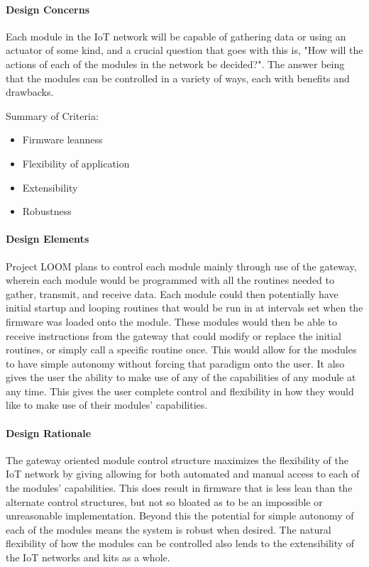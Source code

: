 \documentclass[onecolumn, draftclsnofoot,10pt, compsoc]{IEEEtran}
\begin{document}
\paragraph{Design Concerns}
Each module in the IoT network will be capable of gathering data or using an actuator of some kind, and a crucial question that goes with this is, "How will the actions of each of the modules in the network be decided?". The answer being that the modules can be controlled in a variety of ways, each with benefits and drawbacks.

Summary of Criteria: 
\begin{itemize}[noitemsep,topsep=-10pt]
\item Firmware leanness
\item Flexibility of application
\item Extensibility
\item Robustness
\end{itemize}

\paragraph{Design Elements}
Project LOOM plans to control each module mainly through use of the gateway, wherein each module would be programmed with all the routines needed to gather, transmit, and receive data. Each module could then potentially have initial startup and looping routines that would be run in at intervals set when the firmware was loaded onto the module. These modules would then be able to receive instructions from the gateway that could modify or replace the initial routines, or simply call a specific routine once. This would allow for the modules to have simple autonomy without forcing that paradigm onto the user. It also gives the user the ability to make use of any of the capabilities of any module at any time. This gives the user complete control and flexibility in how they would like to make use of their modules' capabilities.

\paragraph{Design Rationale}
The gateway oriented module control structure maximizes the flexibility of the IoT network by giving allowing for both automated and manual access to each of the modules' capabilities. This does result in firmware that is less lean than the alternate control structures, but not so bloated as to be an impossible or unreasonable implementation. Beyond this the potential for simple autonomy of each of the modules means the system is robust when desired. The natural flexibility of how the modules can be controlled also lends to the extensibility of the IoT networks and kits as a whole. 
\end{document}
